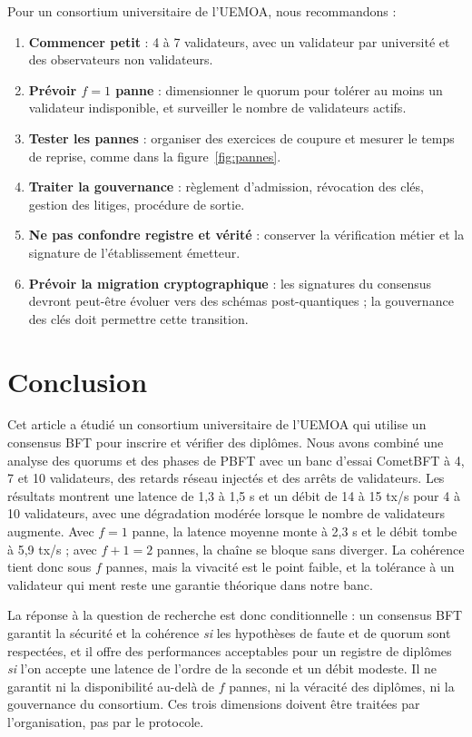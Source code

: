 \documentclass[conference]{IEEEtran}
\begin{document}
Pour un consortium universitaire de l'UEMOA, nous recommandons :

\begin{enumerate}
\item \textbf{Commencer petit} : 4 à 7 validateurs, avec un validateur par université et des observateurs non validateurs.
\item \textbf{Prévoir $f=1$ panne} : dimensionner le quorum pour tolérer au moins un validateur indisponible, et surveiller le nombre de validateurs actifs.
\item \textbf{Tester les pannes} : organiser des exercices de coupure et mesurer le temps de reprise, comme dans la figure~\ref{fig:pannes}.
\item \textbf{Traiter la gouvernance} : règlement d'admission, révocation des clés, gestion des litiges, procédure de sortie.
\item \textbf{Ne pas confondre registre et vérité} : conserver la vérification métier et la signature de l'établissement émetteur.
\item \textbf{Prévoir la migration cryptographique} : les signatures du consensus devront peut-être évoluer vers des schémas post-quantiques ; la gouvernance des clés doit permettre cette transition.
\end{enumerate}

\section{Conclusion}
\label{sec:conclusion}

Cet article a étudié un consortium universitaire de l'UEMOA qui utilise un consensus BFT pour inscrire et vérifier des diplômes. Nous avons combiné une analyse des quorums et des phases de PBFT avec un banc d'essai CometBFT à 4, 7 et 10 validateurs, des retards réseau injectés et des arrêts de validateurs. Les résultats montrent une latence de 1,3 à 1,5 s et un débit de 14 à 15 tx/s pour 4 à 10 validateurs, avec une dégradation modérée lorsque le nombre de validateurs augmente. Avec $f=1$ panne, la latence moyenne monte à 2,3 s et le débit tombe à 5,9 tx/s ; avec $f+1=2$ pannes, la chaîne se bloque sans diverger. La cohérence tient donc sous $f$ pannes, mais la vivacité est le point faible, et la tolérance à un validateur qui ment reste une garantie théorique dans notre banc.

La réponse à la question de recherche est donc conditionnelle : un consensus BFT garantit la sécurité et la cohérence \emph{si} les hypothèses de faute et de quorum sont respectées, et il offre des performances acceptables pour un registre de diplômes \emph{si} l'on accepte une latence de l'ordre de la seconde et un débit modeste. Il ne garantit ni la disponibilité au-delà de $f$ pannes, ni la véracité des diplômes, ni la gouvernance du consortium. Ces trois dimensions doivent être traitées par l'organisation, pas par le protocole.
\end{document}
